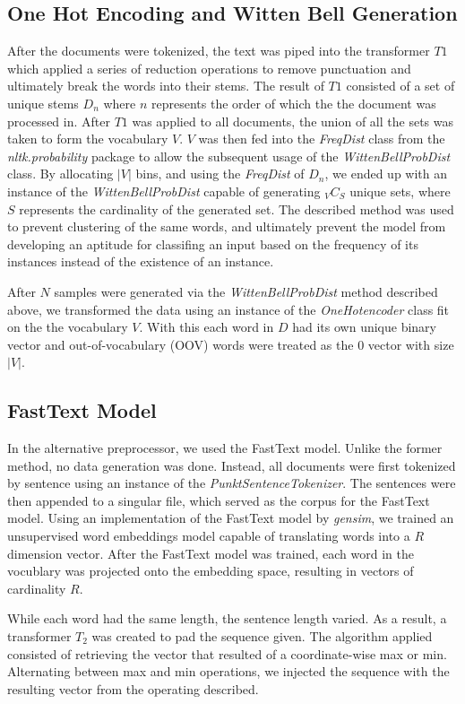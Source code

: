 \documentclass[12pt]{report}
\begin{document}
\subsection{One Hot Encoding and Witten Bell Generation}
After the documents were tokenized, the text was piped into the transformer $T1$ which applied a
series of reduction operations to remove punctuation and ultimately break the words
into their stems. The result of $T1$ consisted of a set of unique stems $D_n$
where $n$ represents the order of which the the document was processed in.
After $T1$ was applied to all documents, the union of all the sets was taken to
form the vocabulary $V$. $V$ was then fed into the \emph{FreqDist} class from
the \emph{nltk.probability} package to allow the subsequent usage of the
\emph{WittenBellProbDist} class. By allocating $|V|$ bins, and using the
\emph{FreqDist} of $D_n$, we ended up with an instance of the
\emph{WittenBellProbDist} capable of generating ${}_{V}C_{S}$ unique sets,
where $S$ represents the cardinality of the generated set. The described method
was used to prevent clustering of the same words, and ultimately prevent the
model from developing an aptitude for classifing an input based on the
frequency of its instances instead of the existence of an instance.


After $N$ samples were generated via the \emph{WittenBellProbDist} method
described above, we transformed the data using an instance of the
\emph{OneHotencoder} class fit on the the vocabulary $V$.
With this each word in $D$ had its own unique binary vector and out-of-vocabulary (OOV)
words were treated as the $0$ vector with size $|V|$.

\subsection{FastText Model}
In the alternative preprocessor, we used the FastText model. Unlike the former method,
no data generation was done. Instead, all documents were first tokenized by sentence using
an instance of the \emph{PunktSentenceTokenizer}. The sentences were then appended to
a singular file, which served as the corpus for the FastText model. Using an implementation of
the FastText model by \emph{gensim}, we trained an unsupervised word embeddings model
capable of translating words into a $R$ dimension vector.
After the FastText model was trained, each word in the vocublary was projected onto
the embedding space, resulting in vectors of cardinality $R$.

While each word had the same length, the sentence length varied. As a result,
a transformer $T_2$ was created to pad the sequence given. The algorithm
applied consisted of retrieving the vector that resulted of a coordinate-wise
max or min. Alternating between max and min operations, we injected the sequence
with the resulting vector from the operating described.
\end{document}
